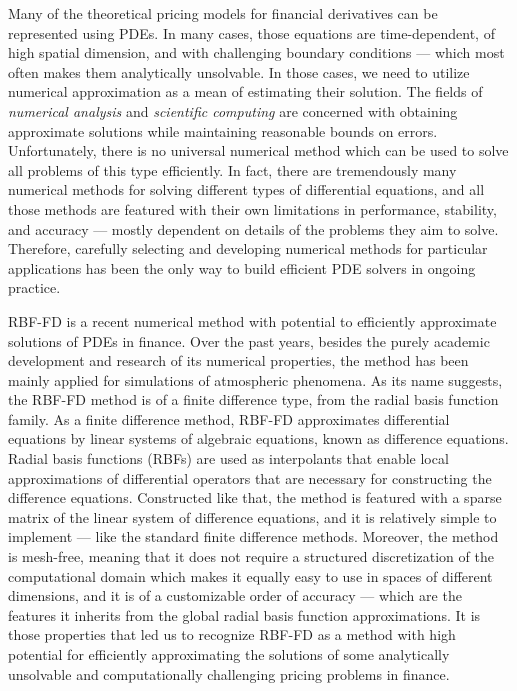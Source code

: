 \documentclass{UUThesisTemplate}
\begin{document}
\par
Many of the theoretical pricing models for financial derivatives can be represented using PDEs. In many cases, those equations are time-dependent, of high spatial dimension, and with challenging boundary conditions --- which most often makes them analytically unsolvable. In those cases, we need to utilize numerical approximation as a mean of estimating their solution. The fields of \emph{numerical analysis} and \emph{scientific computing} are concerned with obtaining approximate solutions while maintaining reasonable bounds on errors. Unfortunately, there is no universal numerical method which can be used to solve all problems of this type efficiently. In fact, there are tremendously many numerical methods for solving different types of differential equations, and all those methods are featured with their own limitations in performance, stability, and accuracy --- mostly dependent on details of the problems they aim to solve. Therefore, carefully selecting and developing numerical methods for particular applications has been the only way to build efficient PDE solvers in ongoing practice. 

\par
RBF-FD is a recent numerical method with potential to efficiently approximate solutions of PDEs in finance. Over the past years, besides the purely academic development and research of its numerical properties, the method has been mainly applied for simulations of atmospheric phenomena. As its name suggests, the RBF-FD method is of a finite difference type, from the radial basis function family. As a finite difference method, RBF-FD approximates differential equations by linear systems of algebraic equations, known as difference equations. Radial basis functions (RBFs) are used as interpolants that enable local approximations of differential operators that are necessary for constructing the difference equations. Constructed like that, the method is featured with a sparse matrix of the linear system of difference equations, and it is relatively simple to implement --- like the standard finite difference methods. Moreover, the method is mesh-free, meaning that it does not require a structured discretization of the computational domain which makes it equally easy to use in spaces of different dimensions, and it is of a customizable order of accuracy --- which are the features it inherits from the global radial basis function approximations. It is those properties that led us to recognize RBF-FD as a method with high potential for efficiently approximating the solutions of some analytically unsolvable and computationally challenging pricing problems in finance.
\end{document}

